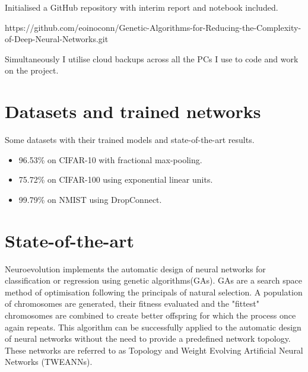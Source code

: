 \documentclass[]{monthly-report}
\begin{document}
Initialised a GitHub repository with interim report and notebook included.

https://github.com/eoinoconn/Genetic-Algorithms-for-Reducing-the-Complexity-of-Deep-Neural-Networks.git

Simultaneously I utilise cloud backups across all the PCs I use to code and work on the project.

\section{Datasets and trained networks}

Some datasets with their trained models and state-of-the-art results.
\begin{itemize}

\item 96.53\% on CIFAR-10 with fractional max-pooling.~\cite{DBLP:journals/corr/Graham14a}

\item 75.72\% on CIFAR-100 using exponential linear units.~\cite{DBLP:journals/corr/ClevertUH15}

\item 99.79\% on NMIST using DropConnect.~\cite{icml2013_wan13}

\end{itemize}



\section{State-of-the-art}
Neuroevolution implements the automatic design of neural networks for classification or regression using genetic algorithms(GAs)\cite{miller1989designing}. GAs are a search space method of optimisation following the principals of natural selection. A population of chromosomes are generated, their fitness evaluated and the "fittest" chromosomes are combined to create better offspring for which the process once again repeats. This algorithm can be successfully applied to the automatic design of neural networks without the need to provide a predefined network topology. These networks are referred to as Topology and Weight Evolving Artificial Neural Networks (TWEANNs).   
\end{document}
